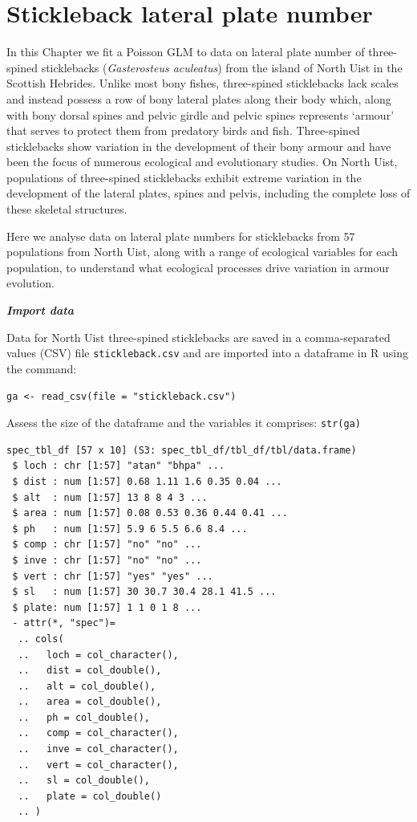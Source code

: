 \documentclass[
]{book}
\begin{document}
\hypertarget{ga-plate}{%
\section{Stickleback lateral plate number}\label{ga-plate}}

In this Chapter we fit a Poisson GLM to data on lateral plate number of three-spined sticklebacks (\emph{Gasterosteus aculeatus}) from the island of North Uist in the Scottish Hebrides. Unlike most bony fishes, three-spined sticklebacks lack scales and instead possess a row of bony lateral plates along their body which, along with bony dorsal spines and pelvic girdle and pelvic spines represents `armour' that serves to protect them from predatory birds and fish. Three-spined sticklebacks show variation in the development of their bony armour and have been the focus of numerous ecological and evolutionary studies. On North Uist, populations of three-spined sticklebacks exhibit extreme variation in the development of the lateral plates, spines and pelvis, including the complete loss of these skeletal structures.

Here we analyse data on lateral plate numbers for sticklebacks from 57 populations from North Uist, along with a range of ecological variables for each population, to understand what ecological processes drive variation in armour evolution.

\emph{\textbf{Import data}}

Data for North Uist three-spined sticklebacks are saved in a comma-separated values (CSV) file \texttt{stickleback.csv} and are imported into a dataframe in R using the command:

\texttt{ga\ \textless{}-\ read\_csv(file\ =\ "stickleback.csv")}

Assess the size of the dataframe and the variables it comprises:
\texttt{str(ga)}

\begin{verbatim}
spec_tbl_df [57 x 10] (S3: spec_tbl_df/tbl_df/tbl/data.frame)
 $ loch : chr [1:57] "atan" "bhpa" ...
 $ dist : num [1:57] 0.68 1.11 1.6 0.35 0.04 ...
 $ alt  : num [1:57] 13 8 8 4 3 ...
 $ area : num [1:57] 0.08 0.53 0.36 0.44 0.41 ...
 $ ph   : num [1:57] 5.9 6 5.5 6.6 8.4 ...
 $ comp : chr [1:57] "no" "no" ...
 $ inve : chr [1:57] "no" "no" ...
 $ vert : chr [1:57] "yes" "yes" ...
 $ sl   : num [1:57] 30 30.7 30.4 28.1 41.5 ...
 $ plate: num [1:57] 1 1 0 1 8 ...
 - attr(*, "spec")=
  .. cols(
  ..   loch = col_character(),
  ..   dist = col_double(),
  ..   alt = col_double(),
  ..   area = col_double(),
  ..   ph = col_double(),
  ..   comp = col_character(),
  ..   inve = col_character(),
  ..   vert = col_character(),
  ..   sl = col_double(),
  ..   plate = col_double()
  .. )
\end{verbatim}
\end{document}
